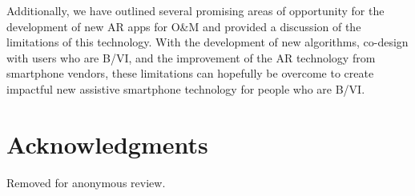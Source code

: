 \documentclass[chi_draft]{sigchi}
\newcommand{\BVI}{B/VI\xspace}
\newcommand{\OM}{O\&M\xspace}
\begin{document}
Additionally, we have outlined several promising areas of opportunity for the development of new AR apps for \OM and provided a discussion of the limitations of this technology.  With the development of new algorithms, co-design with users who are \BVI, and the improvement of the AR technology from smartphone vendors, these limitations can hopefully be overcome to create impactful new assistive smartphone technology for people who are \BVI.  

\section{Acknowledgments}
Removed for anonymous review.


\newpage


\end{document}
